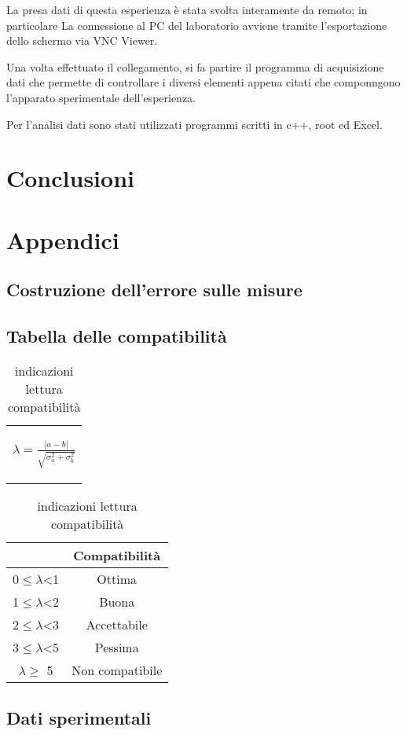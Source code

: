 \documentclass{article}
\begin{document}
La presa dati di questa esperienza è stata svolta interamente da remoto; in particolare La connessione al PC del laboratorio avviene tramite l'esportazione dello schermo via VNC Viewer.

Una volta effettuato il collegamento, si fa partire il programma di acquisizione dati che permette di controllare i diversi elementi appena citati che componngono l'apparato sperimentale dell'esperienza.

Per l'analisi dati sono stati utilizzati programmi scritti in c++, root ed Excel.


\section{Conclusioni}



\newpage
\appendix
\section{Appendici}
\label{appendice}
\subsection{Costruzione dell'errore sulle misure}
\label{Calcerr}

\subsection{Tabella delle compatibilità}
\medskip
\begin{table}[H]
    \centering
    \begin{tabular}{c}
        \begin{Large}
        $\lambda=\frac{|a-b|}{\sqrt{\sigma_a^2+\sigma_b^2}}$
        \end{Large}\\
    \end{tabular}
    \hspace{0.5cm}
    \begin{tabular}{cc}
        \toprule
        &       \textbf{Compatibilità   }       \\
        \midrule
        0$\leq \lambda$<1   &Ottima                 \\
        1$\leq \lambda$<2   &Buona                  \\
        2$\leq \lambda$<3   &Accettabile            \\
        3$\leq\lambda$<5   &Pessima                \\
        $ \lambda \geq $  5     &Non compatibile        \\
        \bottomrule
    \end{tabular}
    \caption{indicazioni lettura compatibilità}
    \label{tab:compatibilità}
\end{table}

\subsection{Dati sperimentali}


   
\end{document}
